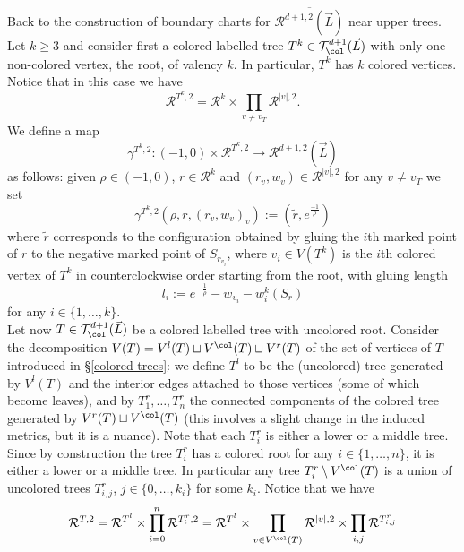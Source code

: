 	Back to the construction of boundary charts for $\overline{\mathcal{R}^{d+1,2}(\vec{L})}$ near upper trees. Let $k\geq 3$ and consider first a colored labelled tree $T^k\in \mathcal{T}^{d+1}_\col(\vec{L})$ with only one non-colored vertex, the root, of valency $k$. In particular, $T^k$ has $k$ colored vertices. Notice that in this case we have $$\mathcal{R}^{T^k,2}= \mathcal{R}^k\times \prod_{v\neq v_T}\mathcal{R}^{|v|,2}.$$ We define a map $$\gamma^{T^k,2}\colon(-1,0)\times \mathcal{R}^{T^k,2}\to \mathcal{R}^{d+1,2}(\vec{L})$$ as follows: given $\rho\in (-1,0)$, $r\in \mathcal{R}^k$ and $(r_v, w_v)\in \mathcal{R}^{|v|,2}$ for any $v\neq v_T$ we set $$\gamma^{T^k,2}\left(\rho, r, (r_v,w_v)_v\right):=(\tilde{r},e^\frac{-1}{\rho})$$ where $\tilde{r}$ corresponds to the configuration obtained by gluing the $i$th marked point of $r$ to the negative marked point of $S_{r_{v_i}}$, where $v_i\in V(T^k)$ is the $i$th colored vertex of $T^k$ in counterclockwise order starting from the root, with gluing length $$l_i:=e^{-{\frac{1}{\rho}}}-w_{v_i}-w_i^k(S_r)$$ for any $i\in \{1,\ldots,k\}$.\\
	Let now $T\in \mathcal{T}^{d+1}_\col(\vec{L})$ be a colored labelled tree with uncolored root. Consider the decomposition $V(T)=V^l(T)\sqcup V^\col(T)\sqcup V^r(T)$ of the set of vertices of $T$ introduced in \S \ref{colored trees}: we define $T^l$ to be the (uncolored) tree generated by $V^l(T)$ and the interior edges attached to those vertices (some of which become leaves), and by $T_1^r,\ldots, T_n^r$ the connected components of the colored tree generated by $V^r(T)\sqcup V^\col(T)$ (this involves a slight change in the induced metrics, but it is a nuance). Note that each $T_i^r$ is either a lower or a middle tree. Since by construction the tree $T_i^r$ has a colored root for any $i\in \{1,\ldots, n\}$, it is either a lower or a middle tree. In particular any tree $T_i^r\setminus V^\col(T)$ is a union of uncolored trees $T_{i,j}^r$, $j\in \{0,\ldots, k_i\}$ for some $k_i$. Notice that we have $$\mathcal{R}^{T,2}= \mathcal{R}^{T^l}\times \prod_{i=0}^n\mathcal{R}^{T_i^r,2}= \mathcal{R}^{T^l}\times \prod_{v\in V^\col(T)}\mathcal{R}^{|v|,2}\times \prod_{i,j}\mathcal{R}^{T_{i,j}^r}$$
	
